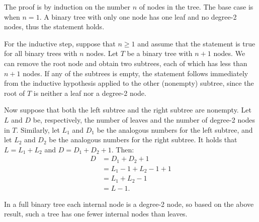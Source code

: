 The proof is by induction on the number $n$ of nodes in the tree.
The base case is when $n=1$.
A binary tree with only one node has one leaf and no degree-2 nodes, thus the statement holds.

For the inductive step, suppose that $n\ge1$ and assume that the statement is true for all binary trees with $n$ nodes.
Let $T$ be a binary tree with $n+1$ nodes.
We can remove the root node and obtain two subtrees, each of which has less than $n+1$ nodes.
If any of the subtrees is empty, the statement follows immediately from the inductive hypothesis applied to the other (nonempty) subtree, since the root of $T$ is neither a leaf nor a degree-2 node.

Now suppose that both the left subtree and the right subtree are nonempty.
Let $L$ and $D$ be, respectively, the number of leaves and the number of degree-2 nodes in $T$.
Similarly, let $L_1$ and $D_1$ be the analogous numbers for the left subtree, and let $L_2$ and $D_2$ be the analogous numbers for the right subtree.
It holds that $L=L_1+L_2$ and $D=D_1+D_2+1$.
Then:
\begin{align*}
    D &= D_1+D_2+1 \\
    &= L_1-1+L_2-1+1 \tag{by the inductive hypothesis} \\
    &= L_1+L_2-1 \\
    &= L-1.
\end{align*}

In a full binary tree each internal node is a degree-2 node, so based on the above result, such a tree has one fewer internal nodes than leaves.
